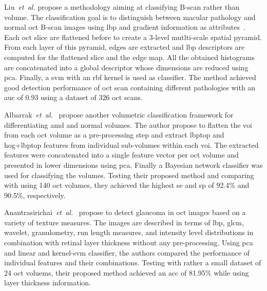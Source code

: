 %
Liu~\textit{et~al.} propose a methodology aiming at classifying B-scan rather than volume.
The classification goal is to distinguish between macular pathology and normal \gls{oct} B-scan images using \gls{lbp} and gradient information as attributes~\cite{Liu2011}.
%
Each \gls{oct} slice are flattened before to create a $3$-level mutlti-scale spatial pyramid.
From each layer of this pyramid, edges are extracted and \gls{lbp} descriptors are computed for the flattened slice and the edge map.
All the obtained histograms are concatenated into a global descriptor whose dimensions are reduced using \gls{pca}.
Finally, a \gls{svm} with an \gls{rbf} kernel is used as classifier.
%
The method achieved good detection performance of \gls{oct} scan containing different pathologies with an \gls{auc} of $0.93$ using a dataset of $326$ \gls{oct} scans.

Albarrak~\textit{et~al.}~\cite{albarrak2013age} propose another volumetric classification framework for differentiating \gls{amd} and normal volumes.
%
The author propose to flatten the \gls{voi} from each \gls{oct} volume as a pre-processing step and extract \gls{lbptop} and \gls{hog}+\gls{lbptop} features from individual sub-volumes within each \gls{voi}.
The extracted features were concatenated into a single feature vector per \gls{oct} volume and presented in lower dimensions using \gls{pca}.
Finally a Bayesian network classifier was used for classifying the volumes.
%
Testing their proposed method and comparing with \cite{Liu2011} using 140 \gls{oct} volumes, they achieved the highest \gls{se} and \gls{sp} of 92.4\% and 90.5\%, respectively.

Anantrasirichai~\textit{et~al.}~\cite{anantrasirichai2013svm} propose to detect glaucoma in \gls{oct} images based on a variety of texture measures.
%
The images are described in terms of \gls{lbp}, \gls{glcm}, wavelet, granulometry, run length measures, and intensity level distributions in combination with retinal layer thickness without any pre-processing.
Using \gls{pca} and linear and kernel-\gls{svm} classifier, the authors compared the performance of individual features and their combinations.
%
Testing with rather a small dataset of 24 \gls{oct} voluems, their proposed method achieved an \gls{acc} of 81.95\% while using layer thickness information.


